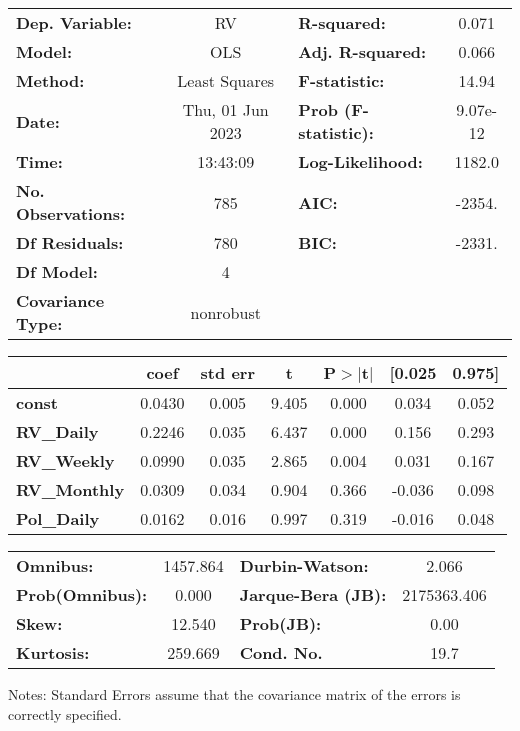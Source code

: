 \begin{center}
\begin{tabular}{lclc}
\toprule
\textbf{Dep. Variable:}    &        RV        & \textbf{  R-squared:         } &      0.071   \\
\textbf{Model:}            &       OLS        & \textbf{  Adj. R-squared:    } &      0.066   \\
\textbf{Method:}           &  Least Squares   & \textbf{  F-statistic:       } &      14.94   \\
\textbf{Date:}             & Thu, 01 Jun 2023 & \textbf{  Prob (F-statistic):} &   9.07e-12   \\
\textbf{Time:}             &     13:43:09     & \textbf{  Log-Likelihood:    } &     1182.0   \\
\textbf{No. Observations:} &         785      & \textbf{  AIC:               } &     -2354.   \\
\textbf{Df Residuals:}     &         780      & \textbf{  BIC:               } &     -2331.   \\
\textbf{Df Model:}         &           4      & \textbf{                     } &              \\
\textbf{Covariance Type:}  &    nonrobust     & \textbf{                     } &              \\
\bottomrule
\end{tabular}
\begin{tabular}{lcccccc}
                     & \textbf{coef} & \textbf{std err} & \textbf{t} & \textbf{P$> |$t$|$} & \textbf{[0.025} & \textbf{0.975]}  \\
\midrule
\textbf{const}       &       0.0430  &        0.005     &     9.405  &         0.000        &        0.034    &        0.052     \\
\textbf{RV\_Daily}   &       0.2246  &        0.035     &     6.437  &         0.000        &        0.156    &        0.293     \\
\textbf{RV\_Weekly}  &       0.0990  &        0.035     &     2.865  &         0.004        &        0.031    &        0.167     \\
\textbf{RV\_Monthly} &       0.0309  &        0.034     &     0.904  &         0.366        &       -0.036    &        0.098     \\
\textbf{Pol\_Daily}  &       0.0162  &        0.016     &     0.997  &         0.319        &       -0.016    &        0.048     \\
\bottomrule
\end{tabular}
\begin{tabular}{lclc}
\textbf{Omnibus:}       & 1457.864 & \textbf{  Durbin-Watson:     } &      2.066   \\
\textbf{Prob(Omnibus):} &   0.000  & \textbf{  Jarque-Bera (JB):  } & 2175363.406  \\
\textbf{Skew:}          &  12.540  & \textbf{  Prob(JB):          } &       0.00   \\
\textbf{Kurtosis:}      & 259.669  & \textbf{  Cond. No.          } &       19.7   \\
\bottomrule
\end{tabular}
\end{center}

Notes: \newline
 [1] Standard Errors assume that the covariance matrix of the errors is correctly specified.